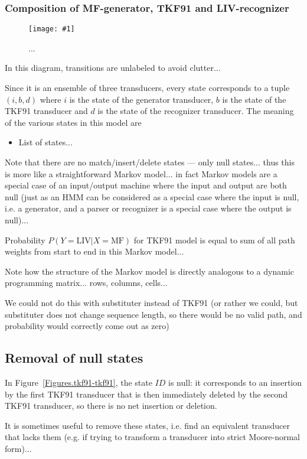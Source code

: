 \documentclass{article}
\newcommand{\figref}[1]{Figure~\ref{Figures.#1}}
\newcommand{\figlabel}[1]{\label{Figures.#1}}
\newcommand{\easyfig}[4]{
\begin{figure}
\texttt{[image: \#1]}
\caption{ \figlabel{#3} #4}
\end{figure}}
\newcommand{\widepdffig}[2]{\easyfig{#1-fig.pdf}{width=\textwidth}{#1}{#2}}
\begin{document}
\subsubsection{Composition of MF-generator, TKF91 and LIV-recognizer}

\widepdffig{mf-tkf91-liv}{...}

In this diagram, transitions are unlabeled to avoid clutter...

Since it is an ensemble of three transducers, every state corresponds to a tuple $(i,b,d)$
where
$i$ is the state of the generator transducer,
$b$ is the state of the TKF91 transducer and
$d$ is the state of the recognizer transducer.
The meaning of the various states in this model are
\begin{itemize}
\item List of states...
\end{itemize}

Note that there are no match/insert/delete states --- only null states...
thus this is more like a straightforward Markov model...
in fact Markov models are a special case of an input/output machine where the input and output are both null
(just as an HMM can be considered as a special case where the input is null, i.e. a generator,
and a parser or recognizer is a special case where the output is null)...

Probability $P(Y=\mbox{LIV}|X=\mbox{MF})$ for TKF91 model
is equal to sum of all path weights from start to end in this Markov model...

Note how the structure of the Markov model is directly analogous to a dynamic programming matrix...
rows, columns, cells...

We could not do this with substituter instead of TKF91
(or rather we could, but substituter does not change sequence length,
so there would be no valid path, and probability would correctly come out as zero)

\subsection{Removal of null states}

In \figref{tkf91-tkf91}, the state $ID$ is null:
it corresponds to an insertion by the first TKF91 transducer
that is then immediately deleted by the second TKF91 transducer,
so there is no net insertion or deletion.

It is sometimes useful to remove these states,
i.e. find an equivalent transducer that lacks them
(e.g. if trying to transform a transducer into strict Moore-normal form)...
\end{document}
